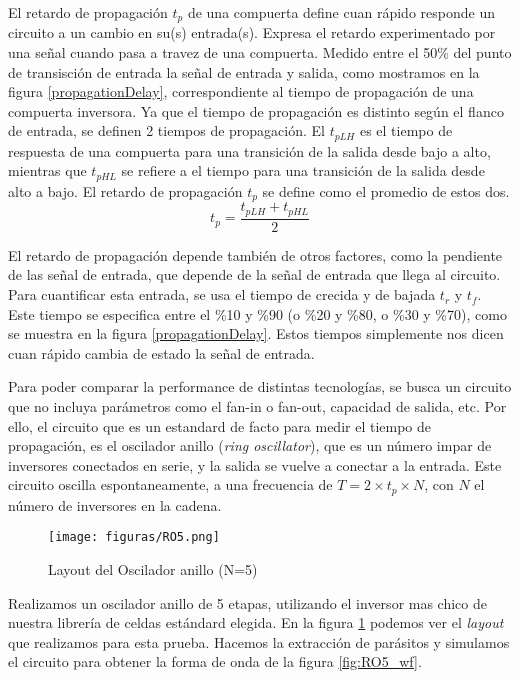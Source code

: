 El retardo de propagación $t_p$ de una compuerta define cuan rápido responde un circuito a un cambio en su(s) entrada(s). Expresa el retardo experimentado por una señal cuando pasa a travez de una compuerta. Medido entre el 50\% del punto de transisción de entrada la señal de entrada y salida, como mostramos en la figura \ref{propagationDelay}, correspondiente al tiempo de propagación de una compuerta inversora. Ya que el tiempo de propagación es distinto según el flanco de entrada, se definen 2 tiempos de propagación. El $t_{pLH}$ es el tiempo de respuesta de una compuerta  para una transición de la salida desde bajo a alto, mientras que $t_{pHL}$ se refiere a el tiempo para una transición de la salida desde alto a bajo. El retardo de propagación $t_p$ se define como el promedio de estos dos.
$$ t_p = \frac{t_{pLH} + t_{pHL}}{2} $$

El retardo de propagación depende también de otros factores, como la pendiente de las señal de entrada, que depende de la señal de entrada que llega al circuito. Para cuantificar esta entrada, se usa el tiempo de crecida y de bajada $t_r$ y $t_f$. Este tiempo se especifica entre el \%10 y \%90 (o \%20 y \%80, o \%30 y \%70), como se muestra en la figura \ref{propagationDelay}. Estos tiempos simplemente nos dicen cuan rápido cambia de estado la señal de entrada.

Para poder comparar la performance de distintas tecnologías, se busca un circuito que no incluya parámetros como el fan-in o fan-out, capacidad de salida, etc. Por ello, el circuito que es un estandard de facto para medir el tiempo de propagación, es el oscilador anillo (\emph{ring oscillator}), que es un número impar de inversores conectados en serie, y la salida se vuelve a conectar a la entrada. Este circuito oscilla espontaneamente, a una frecuencia de $T = 2 \times t_p \times N$, con $N$ el número de inversores en la cadena.

\begin{figure}[h!]
\vspace{-5pt}
  \centering
\texttt{[image: figuras/RO5.png]}
  \caption{Layout del Oscilador anillo (N=5)}
\label{fig:RO5_lay}
\vspace{-10pt}
\end{figure}

Realizamos un oscilador anillo de 5 etapas, utilizando el inversor mas chico de nuestra librería de celdas estándard elegida. En la figura \ref{fig:RO5_lay} podemos ver el \emph{layout} que realizamos para esta prueba. Hacemos la extracción de parásitos y simulamos el circuito para obtener la forma de onda de la figura \ref{fig:RO5_wf}.

